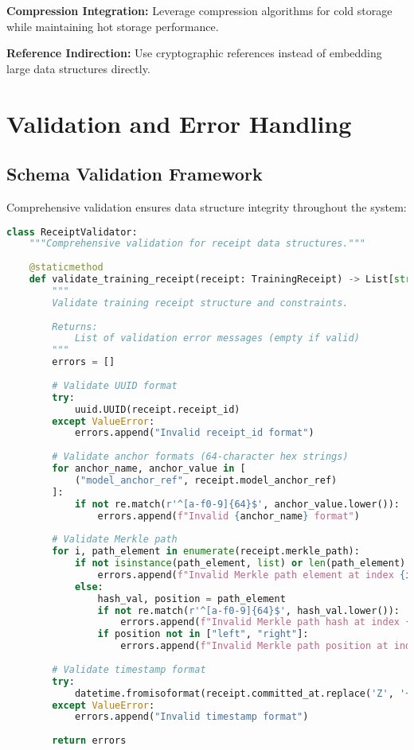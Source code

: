 \documentclass[12pt,a4paper]{article}
\begin{document}
\textbf{Compression Integration:} Leverage compression algorithms for cold storage while maintaining hot storage performance.

\textbf{Reference Indirection:} Use cryptographic references instead of embedding large data structures directly.

\section{Validation and Error Handling}

\subsection{Schema Validation Framework}

Comprehensive validation ensures data structure integrity throughout the system:

\begin{lstlisting}[language=Python, caption=Receipt Validation Framework]
class ReceiptValidator:
    """Comprehensive validation for receipt data structures."""
    
    @staticmethod
    def validate_training_receipt(receipt: TrainingReceipt) -> List[str]:
        """
        Validate training receipt structure and constraints.
        
        Returns:
            List of validation error messages (empty if valid)
        """
        errors = []
        
        # Validate UUID format
        try:
            uuid.UUID(receipt.receipt_id)
        except ValueError:
            errors.append("Invalid receipt_id format")
        
        # Validate anchor formats (64-character hex strings)
        for anchor_name, anchor_value in [
            ("model_anchor_ref", receipt.model_anchor_ref)
        ]:
            if not re.match(r'^[a-f0-9]{64}$', anchor_value.lower()):
                errors.append(f"Invalid {anchor_name} format")
        
        # Validate Merkle path
        for i, path_element in enumerate(receipt.merkle_path):
            if not isinstance(path_element, list) or len(path_element) != 2:
                errors.append(f"Invalid Merkle path element at index {i}: must be [hash, position]")
            else:
                hash_val, position = path_element
                if not re.match(r'^[a-f0-9]{64}$', hash_val.lower()):
                    errors.append(f"Invalid Merkle path hash at index {i}")
                if position not in ["left", "right"]:
                    errors.append(f"Invalid Merkle path position at index {i}: must be 'left' or 'right'")
        
        # Validate timestamp format
        try:
            datetime.fromisoformat(receipt.committed_at.replace('Z', '+00:00'))
        except ValueError:
            errors.append("Invalid timestamp format")
        
        return errors
\end{lstlisting}
\end{document}
